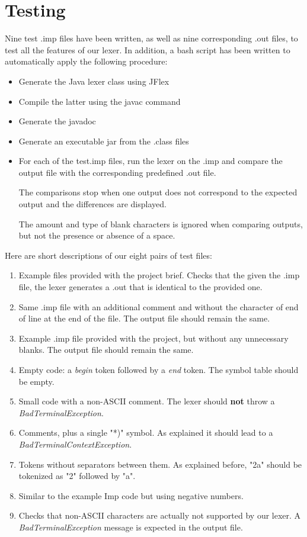 \documentclass[12pt]{report}
\begin{document}
\section{Testing}

Nine test .imp files have been written, as well as nine corresponding .out files, to test all the features of our lexer.
In addition, a bash script has been written to automatically apply the following procedure:

\begin{itemize}
\item Generate the Java lexer class using JFlex
\item Compile the latter using the javac command
\item Generate the javadoc
\item Generate an executable jar from the .class files
\item For each of the test.imp files, run the lexer on the .imp and compare the output file with the corresponding predefined .out file.

  The comparisons stop when one output does not correspond to the expected output and the differences are displayed.

  The amount and type of blank characters is ignored when comparing outputs, but not the presence or absence of a space.
\end{itemize}

Here are short descriptions of our eight pairs of test files:

\begin{enumerate}
\item Example files provided with the project brief. Checks that the given the .imp file, the lexer generates a .out that is identical to the provided one.
\item Same .imp file with an additional comment and without the character of end of line at the end of the file.
  The output file should remain the same.
\item Example .imp file provided with the project, but without any unnecessary blanks.
  The output file should remain the same.
\item Empty code: a \textit{begin} token followed by a \textit{end} token. The symbol table should be empty.
\item Small code with a non-ASCII comment. The lexer should \textbf{not} throw a \textit{BadTerminalException}.
\item Comments, plus a single "*)" symbol. As explained it should lead to a \textit{BadTerminalContextException}.
\item Tokens without separators between them. As explained before, "2a" should be tokenized as "2" followed by "a".
\item Similar to the example Imp code but using negative numbers.
\item Checks that non-ASCII characters are actually not supported by our lexer. A \textit{BadTerminalException} message is expected in the output file.
\end{enumerate}
\end{document}

